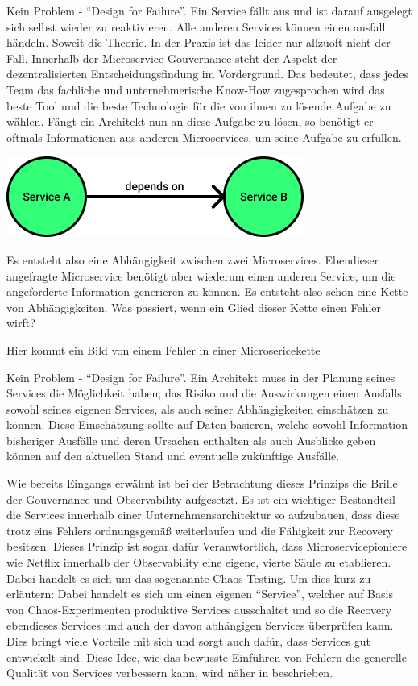 Kein Problem - \enquote{Design for Failure}. Ein Service fällt aus und ist darauf ausgelegt sich selbst wieder zu reaktivieren. Alle anderen Services können einen ausfall händeln. Soweit die Theorie. In der Praxis ist das leider nur allzuoft nicht der Fall. Innerhalb der Microservice-Gouvernance steht der Aspekt der dezentralisierten Entscheidungsfindung im Vordergrund. Das bedeutet, dass jedes Team das fachliche und unternehmerische Know-How zugesprochen wird das beste Tool und die beste Technologie für die von ihnen zu lösende Aufgabe zu wählen. Fängt ein Architekt nun an diese Aufgabe zu lösen, so benötigt er oftmals Informationen aus anderen Microservices, um seine Aufgabe zu erfüllen. 


\begin{center}
	\includegraphics[width=0.55\linewidth]{img/service_dependency.png}
\end{center}

Es entsteht also eine Abhängigkeit zwischen zwei Microservices. Ebendieser angefragte Microservice benötigt aber wiederum einen anderen Service, um die angeforderte Information generieren zu können. Es entsteht also schon eine Kette von Abhängigkeiten. Was passiert, wenn ein Glied dieser Kette einen Fehler wirft? 

\Large Hier kommt ein Bild von einem Fehler in einer Microsericekette

\normalsize

Kein Problem - \enquote{Design for Failure}. Ein Architekt muss in der Planung seines Services die Möglichkeit haben, das Risiko und die Auswirkungen einen Ausfalls sowohl seines eigenen Services, als auch seiner Abhängigkeiten einschätzen zu können. Diese Einschätzung sollte auf Daten basieren, welche sowohl Information bisheriger Ausfälle und deren Ursachen enthalten als auch Ausblicke geben können auf den aktuellen Stand und eventuelle zukünftige Ausfälle.

Wie bereits Eingangs erwähnt ist bei der Betrachtung dieses Prinzips die Brille der Gouvernance und Observability aufgesetzt. Es ist ein wichtiger Bestandteil die Services innerhalb einer Unternehmensarchitektur so aufzubauen, dass diese trotz eins Fehlers ordnungsgemäß weiterlaufen und die Fähigkeit zur Recovery besitzen. Dieses Prinzip ist sogar dafür Veranwtortlich, dass Microservicepioniere wie Netflix innerhalb der Observability eine eigene, vierte Säule zu etablieren. Dabei handelt es sich um das sogenannte Chaos-Testing. Um dies kurz zu erläutern: Dabei handelt es sich um einen eigenen \enquote{Service}, welcher auf Basis von Chaos-Experimenten produktive Services ausschaltet und so die Recovery ebendieses Services und auch der davon abhängigen Services überprüfen kann. Dies bringt viele Vorteile mit sich und sorgt auch dafür, dass Services gut entwickelt sind. Diese Idee, wie das bewusste Einführen von Fehlern die generelle Qualität von Services verbessern kann, wird näher in \autocite{AntifragileOrganization} beschrieben.

